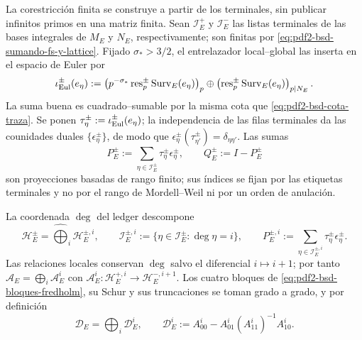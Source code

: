 La corestricción finita se construye a partir de los terminales, sin publicar
infinitos primos en una matriz finita. Sean $\mathcal I_E^+$ y
$\mathcal I_E^-$ las listas terminales de las bases integrales de $M_E$ y
$N_E$, respectivamente; son finitas por
\eqref{eq:pdf2-bsd-sumando-fs-y-lattice}. Fijado $\sigma_*>3/2$, el
entrelazador local--global las inserta en el espacio de Euler por
\begin{equation}\label{eq:pdf2-bsd-embedding-terminal-euler}
 \iota_{\rm Eul}^\pm(e_\eta):=
 \left(p^{-\sigma_*}\operatorname{res}_p^\pm
       \operatorname{Surv}_E(e_\eta)\right)_p
 \oplus\left(\operatorname{res}_p^\pm
       \operatorname{Surv}_E(e_\eta)\right)_{p\mid N_E}.
\end{equation}
La suma buena es cuadrado--sumable por la misma cota que
\eqref{eq:pdf2-bsd-cota-traza}. Se ponen
$\tau_\eta^\pm:=\iota_{\rm Eul}^\pm(e_\eta)$; la independencia de las filas
terminales da las counidades duales $\{\epsilon_{\eta}^{\pm}\}$, de modo que
$\epsilon_\eta^\pm(\tau_{\eta'}^\pm)=\delta_{\eta\eta'}$. Las sumas
\begin{equation}\label{eq:pdf2-bsd-proyecciones-terminales-finitas}
 P_E^\pm:=\sum_{\eta\in\mathcal I_E^\pm}
      \tau_\eta^\pm\epsilon_\eta^\pm,
 \qquad Q_E^\pm:=I-P_E^\pm
\end{equation}
son proyecciones basadas de rango finito; sus índices se fijan por las
etiquetas terminales y no por el rango de Mordell--Weil ni por un orden de
anulación.

La coordenada $\deg$ del ledger descompone
\begin{equation}\label{eq:pdf2-bsd-graduacion-fredholm}
 \mathscr H_E^\pm=\widehat\bigoplus_i\mathscr H_E^{\pm,i},
 \qquad
 \mathcal I_E^{\pm,i}:=\{\eta\in\mathcal I_E^\pm:\deg\eta=i\},
 \qquad
 P_E^{\pm,i}:=
 \sum_{\eta\in\mathcal I_E^{\pm,i}}\tau_\eta^\pm\epsilon_\eta^\pm.
\end{equation}
Las relaciones locales conservan $\deg$ salvo el diferencial $i\mapsto i+1$;
por tanto
$\mathscr A_E=\bigoplus_i\mathscr A_E^i$ con
$\mathscr A_E^i:\mathscr H_E^{+,i}\to\mathscr H_E^{-,i+1}$. Los cuatro
bloques de \eqref{eq:pdf2-bsd-bloques-fredholm}, su Schur y sus truncaciones
se toman grado a grado, y por definición
\begin{equation}\label{eq:pdf2-bsd-schur-graduado}
 \mathscr D_E=\bigoplus_i\mathscr D_E^i,
 \qquad
 \mathscr D_E^i:=A_{00}^i-A_{01}^i(A_{11}^i)^{-1}A_{10}^i.
\end{equation}

